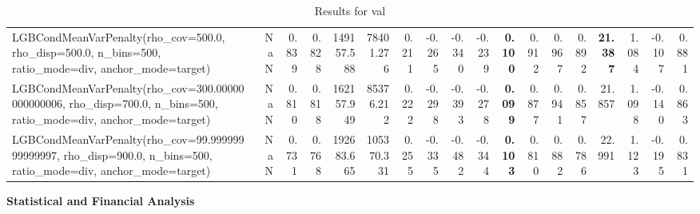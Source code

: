 \documentclass[11pt]{article}
\theoremstyle{plain}
\theoremstyle{definition}
\newcommand{\1}{\mathbf{1}}
\begin{document}
\begin{table}[htbp]
{\begin{tabular}{lrrrrrrrrrrrrrrrrr}
LGBCondMeanVarPenalty(rho\_cov=500.0, rho\_disp=500.0, n\_bins=500, ratio\_mode=div, anchor\_mode=target) & NaN & 0.839 & 0.828 & 149157.588 & 78401.276 & 0.211 & -0.265 & -0.340 & -0.239 & \textbf{0.100} & 0.912 & 0.967 & 0.892 & \textbf{21.387} & 1.084 & -0.107 & 0.881 \\
LGBCondMeanVarPenalty(rho\_cov=300.00000000000006, rho\_disp=700.0, n\_bins=500, ratio\_mode=div, anchor\_mode=target) & NaN & 0.810 & 0.818 & 162157.949 & 85376.212 & 0.222 & -0.298 & -0.393 & -0.278 & \textbf{0.099} & 0.877 & 0.941 & 0.857 & 21.857 & 1.098 & -0.140 & 0.863 \\
LGBCondMeanVarPenalty(rho\_cov=99.99999999999997, rho\_disp=900.0, n\_bins=500, ratio\_mode=div, anchor\_mode=target) & NaN & 0.731 & 0.768 & 192683.665 & 105370.331 & 0.255 & -0.335 & -0.482 & -0.344 & \textbf{0.103} & 0.810 & 0.882 & 0.786 & 22.991 & 1.123 & -0.195 & 0.831 \\
\bottomrule
\end{tabular}
     }
    \caption{Results for val}
    \label{tab:results_val}
\end{table}








\textbf{Statistical and Financial Analysis}




\end{document}

